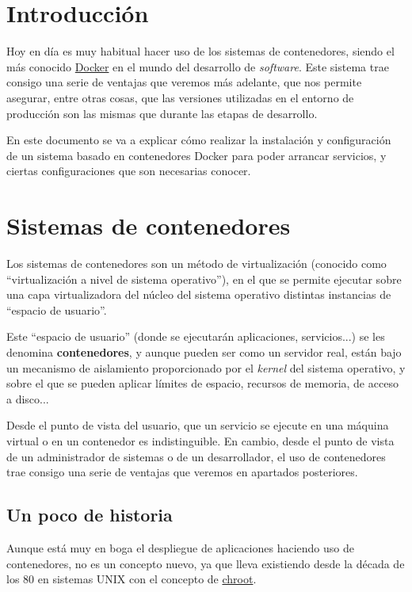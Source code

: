 \chapter{Introducción}

Hoy en día es muy habitual hacer uso de los sistemas de contenedores, siendo el más conocido  \href{https://docs.docker.com/}{Docker} en el mundo del desarrollo de \textit{software}. Este sistema trae consigo una serie de ventajas que veremos más adelante, que nos permite asegurar, entre otras cosas, que las versiones utilizadas en el entorno de producción son las mismas que durante las etapas de desarrollo.

En este documento se va a explicar cómo realizar la instalación y configuración de un sistema basado en contenedores Docker para poder arrancar servicios, y ciertas configuraciones que son necesarias conocer.

\chapter{Sistemas de contenedores}

Los sistemas de contenedores son un método de virtualización (conocido como “virtualización a nivel de sistema operativo”), en el que se permite ejecutar sobre una capa virtualizadora del núcleo del sistema operativo distintas instancias de “espacio de usuario”.

Este “espacio de usuario” (donde se ejecutarán aplicaciones, servicios...) se les denomina \textbf{contenedores}, y aunque pueden ser como un servidor real, están bajo un mecanismo de aislamiento proporcionado por el \textit{kernel} del sistema operativo, y sobre el que se pueden aplicar límites de espacio, recursos de memoria, de acceso a disco...


Desde el punto de vista del usuario, que un servicio se ejecute en una máquina virtual o en un contenedor es indistinguible. En cambio, desde el punto de vista de un administrador de sistemas o de un desarrollador, el uso de contenedores trae consigo una serie de ventajas que veremos en apartados posteriores.


\section{Un poco de historia}
Aunque está muy en boga el despliegue de aplicaciones haciendo uso de contenedores, no es un concepto nuevo, ya que lleva existiendo desde la década de los 80 en sistemas UNIX con el concepto de \href{https://es.wikipedia.org/wiki/Chroot}{chroot}.

